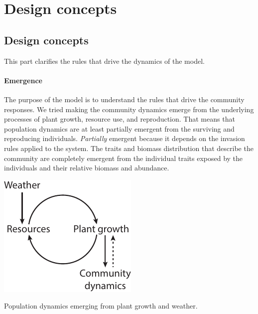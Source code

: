 \section{Design concepts}

\subsection{Design concepts}
This part clarifies the rules that drive the dynamics of the model.

\paragraph{Emergence} 
The purpose of the model is to understand the rules that drive the community responses. We tried making the community dynamics emerge from the underlying processes of plant growth, resource use, and reproduction. That means that population dynamics are at least partially emergent from the surviving and reproducing individuals.
\textit{Partially} emergent because it depends on the invasion rules applied to the system. The traits and biomass distribution that describe the community are completely emergent from the individual traits exposed by the individuals and their relative biomass and abundance.
\begin{marginfigure}[-8pt]
\includegraphics{./Figures/emergence.pdf}
\caption{Population dynamics emerging from plant growth and weather.}
\end{marginfigure}

